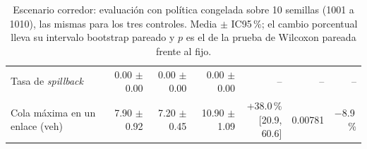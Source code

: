 \begin{table}[H]
\begin{tabular}{lrrrrrr}
Tasa de \textit{spillback} & 0.00 $\pm$ 0.00 & 0.00 $\pm$ 0.00 & 0.00 $\pm$ 0.00 & -- & -- & -- \\
Cola máxima en un enlace (veh) & 7.90 $\pm$ 0.92 & 7.20 $\pm$ 0.45 & 10.90 $\pm$ 1.09 & \makecell{+38.0\,\%\\{}[20.9, 60.6]} & 0.00781 & $-$8.9\,\% \\
\bottomrule
\end{tabular}
\caption[Escenario corredor: evaluación con política congelada]{Escenario corredor: evaluación con política congelada sobre 10 semillas (1001 a 1010), las mismas para los tres controles. Media $\pm$ IC95\,\%; el cambio porcentual lleva su intervalo bootstrap pareado y $p$ es el de la prueba de Wilcoxon pareada frente al fijo.}
\label{tab:corredor-evaluacion}
\end{table}
